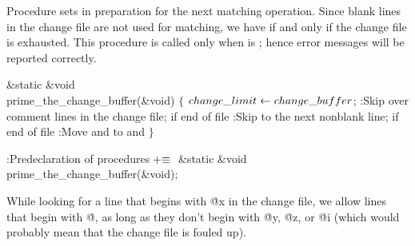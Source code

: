 {Procedure 
sets  in preparation for the next matching operation.
Since blank lines in the change file are not used for matching, we have
 if and only if
the change file is exhausted. This procedure is called only when
 is ; hence error messages will be reported
correctly.

\Y\B\1\1\&{static} \&{void} \\{prime\_the\_change\_buffer}(\&{void})\2\2\6
${}\{{}$\1\6
${}\\{change\_limit}\leftarrow\\{change\_buffer}{}$;\6
:Skip over comment lines in the change file;  if end of file%
\X\6
:Skip to the next nonblank line;  if end of file\X\6
:Move  and  to  and %
\X\6
\4${}\}{}$\2\par
\fi

\B{}:Predeclaration of procedures\X${}\mathrel+\equiv{}$\5
\&{static} \&{void} \\{prime\_the\_change\_buffer}(\&{void});\par
\fi

While looking for a line that begins with \.{@x} in the change file, we
allow lines that begin with \.{@}, as long as they don't begin with \.{@y},
\.{@z}, or \.{@i} (which would probably mean that the change file is fouled
up).

}
